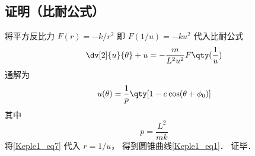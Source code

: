 \subsection{证明（比耐公式）}

将平方反比力 $F(r) = -k/r^2$ 即 $F(1/u) = -ku^2$ 代入比耐公式
\begin{equation}
\dv[2]{u}{\theta} + u = -\frac{m}{L^2 u^2} F\qty(\frac 1u)
\end{equation}
通解为
\begin{equation}\label{Keple1_eq7}
u(\theta) = \frac{1}{p} \qty[1 - e\cos(\theta  + \phi_0)]
\end{equation}
其中
\begin{equation}
p = \frac{L^2}{mk}
\end{equation}
将\autoref{Keple1_eq7} 代入 $r = 1/u$， 得到圆锥曲线\autoref{Keple1_eq1}． 证毕．
